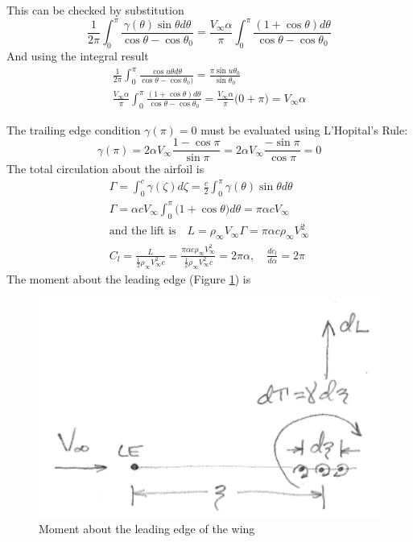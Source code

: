 \documentclass[draft=false, titlepage]{article}
\begin{document}
This can be checked by substitution
\begin{equation*}
    \frac{1}{2\pi} \int_0^\pi \frac{\gamma(\theta)\sin\theta d\theta}{\cos\theta - \cos\theta_0} = \frac{V_\infty \alpha}{\pi} \int_0^\pi \frac{(1+\cos\theta)d\theta}{\cos\theta - \cos\theta_0}
\end{equation*}
And using the integral result
\begin{gather*}
    \frac{1}{2\pi} \int_0^\pi \frac{\cos u\theta d\theta}{\cos\theta - \cos\theta_0)} = \frac{\pi \sin u\theta_0}{\sin\theta_0}\\
    \frac{V_\infty \alpha}{\pi} \int_0^\pi \frac{(1+\cos \theta)d\theta}{\cos\theta - \cos\theta_0} = \frac{V_\infty \alpha}{\pi} \big( 0 + \pi \big) = V_\infty \alpha
\end{gather*}

The trailing edge condition $\gamma(\pi) = 0$ must be evaluated using L'Hopital's Rule:
\begin{equation*}
    \gamma(\pi) = 2\alpha V_\infty \frac{1-\cos\pi}{\sin \pi} = 2\alpha V_\infty \frac{-\sin\pi}{\cos\pi} = 0
\end{equation*}
The total circulation about the airfoil is
\begin{gather*}
    \Gamma = \int_0^c \gamma(\zeta) d\zeta = \frac{c}{2} \int_0^\pi \gamma(\theta)\sin\theta d\theta\\
    \Gamma = \alpha c V_\infty \int_0^\pi \big(1 + \cos\theta \big) d\theta = \pi \alpha c V_\infty\\
    \text{and the lift is} \quad L = \rho_\infty V_\infty \Gamma = \pi \alpha c \rho_\infty V_\infty^2\\
    C_l = \frac{L}{\frac{1}{2}\rho_\infty V_\infty^2 c} = \frac{\pi \alpha c \rho_\infty V_\infty^2}{\frac{1}{2} \rho_\infty V_\infty^2 c} = 2\pi \alpha,\quad \boxed{\frac{dc_l}{d\alpha} = 2\pi}
\end{gather*}
The moment about the leading edge (Figure \ref{fig:momentLeadingEdge}) is
\begin{figure}[ht]
    \centering
    \includegraphics[width=0.4\linewidth]{Figures/momentLeadingEdgePg91.PNG}
    \caption{Moment about the leading edge of the wing}
    \label{fig:momentLeadingEdge}
\end{figure}
\end{document}
